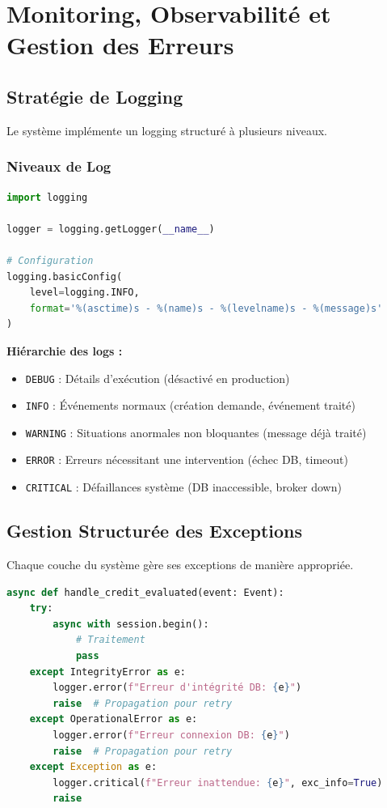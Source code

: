 \documentclass[12pt,a4paper]{article}
\begin{document}
\section{Monitoring, Observabilité et Gestion des Erreurs}

\subsection{Stratégie de Logging}

Le système implémente un logging structuré à plusieurs niveaux.

\subsubsection{Niveaux de Log}

\begin{lstlisting}[language=Python]
import logging

logger = logging.getLogger(__name__)

# Configuration
logging.basicConfig(
    level=logging.INFO,
    format='%(asctime)s - %(name)s - %(levelname)s - %(message)s'
)
\end{lstlisting}

\textbf{Hiérarchie des logs :}

\begin{itemize}
    \item \texttt{DEBUG} : Détails d'exécution (désactivé en production)
    \item \texttt{INFO} : Événements normaux (création demande, événement traité)
    \item \texttt{WARNING} : Situations anormales non bloquantes (message déjà traité)
    \item \texttt{ERROR} : Erreurs nécessitant une intervention (échec DB, timeout)
    \item \texttt{CRITICAL} : Défaillances système (DB inaccessible, broker down)
\end{itemize}

\subsection{Gestion Structurée des Exceptions}

Chaque couche du système gère ses exceptions de manière appropriée.

\begin{lstlisting}[language=Python]
async def handle_credit_evaluated(event: Event):
    try:
        async with session.begin():
            # Traitement
            pass
    except IntegrityError as e:
        logger.error(f"Erreur d'intégrité DB: {e}")
        raise  # Propagation pour retry
    except OperationalError as e:
        logger.error(f"Erreur connexion DB: {e}")
        raise  # Propagation pour retry
    except Exception as e:
        logger.critical(f"Erreur inattendue: {e}", exc_info=True)
        raise
\end{lstlisting}
\end{document}
